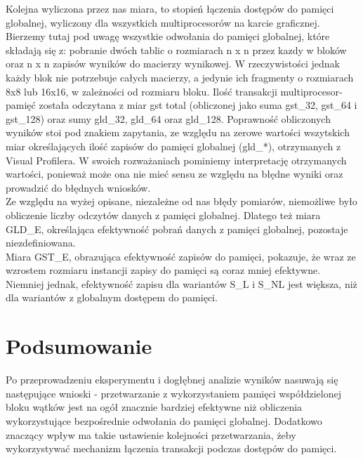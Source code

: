\documentclass[10pt,a4paper]{article}
\begin{document}
Kolejna wyliczona przez nas miara, to stopień łączenia dostępów do pamięci globalnej, 
wyliczony dla wszystkich multiprocesorów na karcie graficznej. \\

Bierzemy tutaj pod uwagę wszystkie odwołania do pamięci globalnej, które składają się z:
pobranie dwóch tablic o rozmiarach n x n przez kazdy w bloków oraz n x n
zapisów wyników do macierzy wynikowej. W rzeczywistości jednak każdy blok nie potrzebuje
całych macierzy, a jedynie ich fragmenty o rozmiarach 8x8 lub 16x16, w zależności
od rozmiaru bloku. Ilość transakcji multiprocesor-pamięć została odczytana z
miar gst total (obliczonej jako suma gst\_32, gst\_64 i gst\_128) oraz sumy gld\_32, gld\_64 oraz
gld\_128. Poprawność obliczonych wyników stoi pod znakiem zapytania, ze względu na zerowe wartości 
wszytskich miar określających ilość zapisów do pamięci globalnej (gld\_*), otrzymanych
z Visual Profilera. W swoich rozważaniach pominiemy interpretację otrzymanych 
wartości, ponieważ może ona nie mieć sensu ze względu na błędne wyniki oraz prowadzić do 
błędnych wniosków. \\

Ze względu na wyżej opisane, niezależne od nas błędy pomiarów, niemożliwe było obliczenie 
liczby odczytów danych z pamięci globalnej. Dlatego też miara GLD\_E, określająca efektywność 
pobrań danych z pamięci globalnej, pozostaje niezdefiniowana. \\

Miara GST\_E, obrazująca efektywność zapisów do pamięci, pokazuje, że wraz ze wzrostem rozmiaru
instancji zapisy do pamięci są coraz mniej efektywne. Niemniej jednak, efektywność zapisu dla 
wariantów S\_L i S\_NL jest większa, niż dla wariantów z globalnym dostępem do pamięci. 

\section{Podsumowanie}
Po przeprowadzeniu eksperymentu i dogłębnej analizie wyników nasuwają się następujące wnioski - 
przetwarzanie z wykorzystaniem pamięci współdzielonej bloku wątków jest na ogół znacznie bardziej
efektywne niż obliczenia wykorzystujące bezpośrednie odwołania do pamięci globalnej. Dodatkowo
znaczący wpływ ma takie ustawienie kolejności przetwarzania, żeby wykorzystywać mechanizm łączenia
transakcji podczas dostępów do pamięci.
\end{document}
